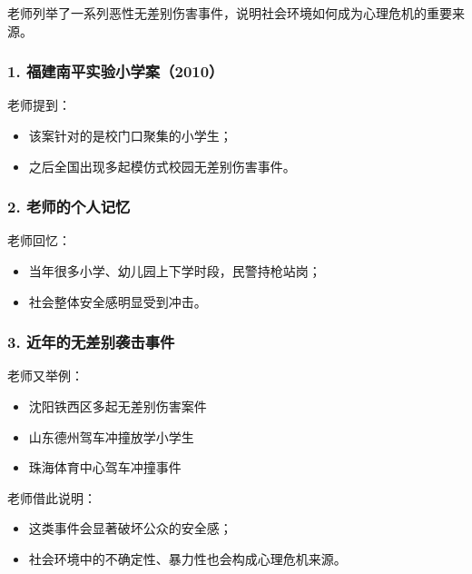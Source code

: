 \documentclass[
  chinese,
  9pt,
  a4paper,
]{ctexart}
\providecommand{\tightlist}{%
  \setlength{\itemsep}{0pt}\setlength{\parskip}{0pt}}
\begin{document}
老师列举了一系列恶性无差别伤害事件，说明社会环境如何成为心理危机的重要来源。

\subsubsection{1.
福建南平实验小学案（2010）}\label{ux798fux5efaux5357ux5e73ux5b9eux9a8cux5c0fux5b66ux68482010}

老师提到：

\begin{itemize}
\tightlist
\item
  该案针对的是校门口聚集的小学生；
\item
  之后全国出现多起模仿式校园无差别伤害事件。
\end{itemize}

\subsubsection{2.
老师的个人记忆}\label{ux8001ux5e08ux7684ux4e2aux4ebaux8bb0ux5fc6}

老师回忆：

\begin{itemize}
\tightlist
\item
  当年很多小学、幼儿园上下学时段，民警持枪站岗；
\item
  社会整体安全感明显受到冲击。
\end{itemize}

\subsubsection{3.
近年的无差别袭击事件}\label{ux8fd1ux5e74ux7684ux65e0ux5deeux522bux88adux51fbux4e8bux4ef6}

老师又举例：

\begin{itemize}
\tightlist
\item
  沈阳铁西区多起无差别伤害案件
\item
  山东德州驾车冲撞放学小学生
\item
  珠海体育中心驾车冲撞事件
\end{itemize}

老师借此说明：

\begin{itemize}
\tightlist
\item
  这类事件会显著破坏公众的安全感；
\item
  社会环境中的不确定性、暴力性也会构成心理危机来源。
\end{itemize}
\end{document}
